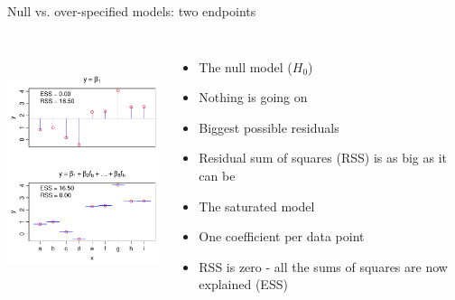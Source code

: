 \documentclass[xcolor=x11names,compress]{beamer}
\renewcommand{\(}{\begin{columns}}
\renewcommand{\)}{\end{columns}}
\newcommand{\<}[1]{\begin{column}{#1}}
\renewcommand{\>}{\end{column}}
\begin{document}
\begin{frame}{Null vs. over-specified models: two endpoints}

    \begin{columns}[T]
		\includegraphics[height=72mm]{NullSaturated.pdf}

		\begin{itemize}
		\item The null model ($H_0$)
		\item Nothing is going on
		\item Biggest possible residuals
		\item Residual sum of squares (RSS) is as big as it can be
		\vspace{1cm}
		\item The saturated model
		\item One coefficient per data point
		\item RSS is zero - all the sums of squares are now explained (ESS)
		\end{itemize}
		
\end{columns}
\end{frame}
\end{document}

